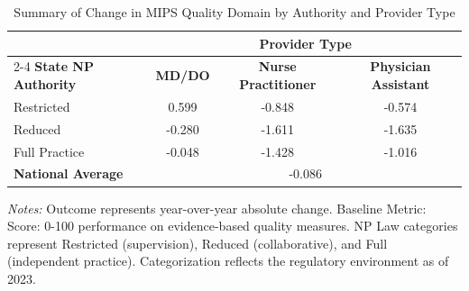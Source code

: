 \begin{table}[htbp]
    \centering
    \caption{Summary of Change in MIPS Quality Domain by Authority and Provider Type}
    \label{tab:d_mips_quality_score_provtype}
    \vspace{0.2cm}
    \begin{tabular}{lccc}
        \toprule
        & \multicolumn{3}{c}{\textbf{Provider Type}} \\
        \cmidrule(lr){2-4}
        \textbf{State NP Authority} & \textbf{MD/DO} & \textbf{Nurse Practitioner} & \textbf{Physician Assistant} \\
        \midrule
        Restricted & 0.599 & -0.848 & -0.574 \\
        Reduced & -0.280 & -1.611 & -1.635 \\
        Full Practice & -0.048 & -1.428 & -1.016 \\
        \midrule
        \textbf{National Average} & \multicolumn{3}{c}{-0.086} \\
        \bottomrule
    \end{tabular}
    \vspace{0.1cm}
    \begin{minipage}{0.85\textwidth}
        \footnotesize \textit{Notes:} Outcome represents year-over-year absolute change. Baseline Metric: Score: 0-100 performance on evidence-based quality measures. NP Law categories represent Restricted (supervision), Reduced (collaborative), and Full (independent practice). Categorization reflects the regulatory environment as of 2023.
    \end{minipage}
\end{table}